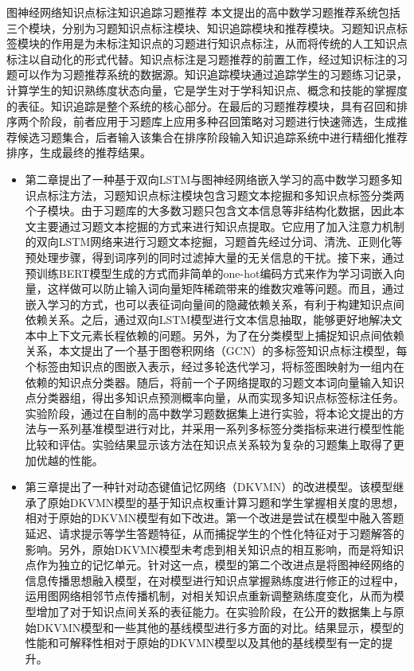 \begin{abstractC}{图神经网络}{知识点标注}{知识追踪}{习题推荐}{}
    本文提出的高中数学习题推荐系统包括三个模块，分别为习题知识点标注模块、知识追踪模块和推荐模块。习题知识点标签模块的作用是为未标注知识点的习题进行知识点标注，从而将传统的人工知识点标注以自动化的形式代替。知识点标注是习题推荐的前置工作，经过知识标注的习题可以作为习题推荐系统的数据源。知识追踪模块通过追踪学生的习题练习记录，计算学生的知识熟练度状态向量，它是学生对于学科知识点、概念和技能的掌握度的表征。知识追踪是整个系统的核心部分。在最后的习题推荐模块，具有召回和排序两个阶段，前者应用于习题库上应用多种召回策略对习题进行快速筛选，生成推荐候选习题集合，后者输入该集合在排序阶段输入知识追踪系统中进行精细化推荐排序，生成最终的推荐结果。
    \begin{itemize}
        \item 第二章提出了一种基于双向LSTM与图神经网络嵌入学习的高中数学习题多知识点标注方法，习题知识点标注模块包含习题文本挖掘和多知识点标签分类两个子模块。由于习题库的大多数习题只包含文本信息等非结构化数据，因此本文主要通过习题文本挖掘的方式来进行知识点提取。它应用了加入注意力机制的双向LSTM网络来进行习题文本挖掘，习题首先经过分词、清洗、正则化等预处理步骤，得到词序列的同时过滤掉大量的无关信息的干扰。接下来，通过预训练BERT模型生成的方式而非简单的one-hot编码方式来作为学习词嵌入向量，这样做可以防止输入词向量矩阵稀疏带来的维数灾难等问题。而且，通过嵌入学习的方式，也可以表征词向量间的隐藏依赖关系，有利于构建知识点间依赖关系。之后，通过双向LSTM模型进行文本信息抽取，能够更好地解决文本中上下文元素长程依赖的问题。另外，为了在分类模型上捕捉知识点间依赖关系，本文提出了一个基于图卷积网络（GCN）的多标签知识点标注模型，每个标签由知识点的图嵌入表示，经过多轮迭代学习，将标签图映射为一组内在依赖的知识点分类器。随后，将前一个子网络提取的习题文本词向量输入知识点分类器组，得出多知识点预测概率向量，从而实现多知识点标签标注任务。实验阶段，通过在自制的高中数学习题数据集上进行实验，将本论文提出的方法与一系列基准模型进行对比，并采用一系列多标签分类指标来进行模型性能比较和评估。实验结果显示该方法在知识点关系较为复杂的习题集上取得了更加优越的性能。
        \item 第三章提出了一种针对动态键值记忆网络（DKVMN）的改进模型。该模型继承了原始DKVMN模型的基于知识点权重计算习题和学生掌握相关度的思想，相对于原始的DKVMN模型有如下改进。第一个改进是尝试在模型中融入答题延迟、请求提示等学生答题特征，从而捕捉学生的个性化特征对于习题解答的影响。另外，原始DKVMN模型未考虑到相关知识点的相互影响，而是将知识点作为独立的记忆单元。针对这一点，模型的第二个改进点是将图神经网络的信息传播思想融入模型，在对模型进行知识点掌握熟练度进行修正的过程中，运用图网络相邻节点传播机制，对相关知识点重新调整熟练度变化，从而为模型增加了对于知识点间关系的表征能力。在实验阶段，在公开的数据集上与原始DKVMN模型和一些其他的基线模型进行多方面的对比。结果显示，模型的性能和可解释性相对于原始的DKVMN模型以及其他的基线模型有一定的提升。

\end{itemize}
\end{abstractC}
